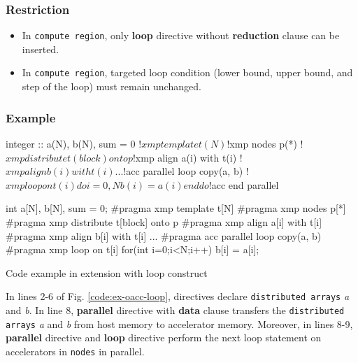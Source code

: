 \subsubsection*{Restriction}
\begin{itemize}
\item In {\OACC} {\tt compute region},
only {\XMP} {\bf loop} directive without {\bf reduction} clause can be inserted.
\item In {\OACC} {\tt compute region},
targeted loop condition (lower bound, upper bound, and step of the loop)
must remain unchanged.
\end{itemize}

\subsubsection*{Example}
\begin{myfigure}
\begin{minipage}{0.45\hsize}
\begin{center}
\begin{XACCFexampleL}
integer :: a(N), b(N), sum = 0
!$xmp template t(N)
!$xmp nodes p(*)
!$xmp distribute t(block) onto p
!$xmp align a(i) with t(i)
!$xmp align b(i) with t(i)
...
!$acc parallel loop copy(a, b)
!$xmp loop on t(i)
do i=0, N
  b(i) = a(i)
end do
!$acc end parallel
\end{XACCFexampleL}
\end{center}
\end{minipage}
%
\begin{minipage}{0.53\hsize}
\begin{center}
\begin{XACCCexampleR}
int a[N], b[N], sum = 0;
#pragma xmp template t[N]
#pragma xmp nodes p[*]
#pragma xmp distribute t[block] onto p
#pragma xmp align a[i] with t[i]
#pragma xmp align b[i] with t[i]
...
#pragma acc parallel loop copy(a, b)
#pragma xmp loop on t[i]
for(int i=0;i<N;i++){
  b[i] = a[i];
}

\end{XACCCexampleR}
\end{center}
\end{minipage}
\caption{Code example in {\XMP} extension with {\OACC} loop construct}\label{code:ex-oacc-loop}
\end{myfigure}

In lines 2-6 of Fig. \ref{code:ex-oacc-loop},
{\XMP} directives declare {\tt distributed arrays} {\it a} and {\it b}.
In line 8,
{\OACC} {\bf parallel} directive with {\bf data} clause transfers the {\tt distributed arrays} {\it a} and {\it b} from host memory to accelerator memory.
Moreover,
in lines 8-9,
{\OACC} {\bf parallel} directive and {\XMP} {\bf loop} directive perform the next loop statement on accelerators in {\tt nodes} in parallel.

